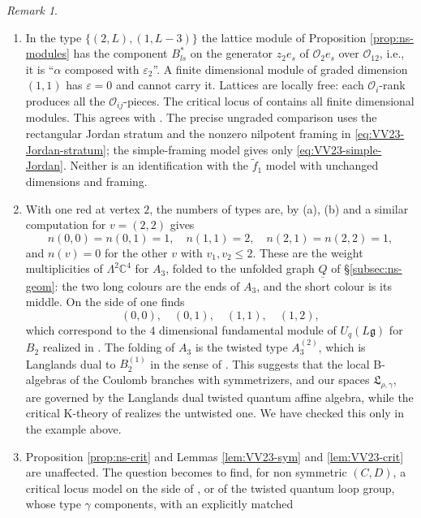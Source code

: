 \documentclass[11pt,reqno]{amsart}
\theoremstyle{definition}
\theoremstyle{remark}
\newtheorem{Remark}[Theorem]{Remark}
\def\bbC{\mathbb C}
\def\dQ{\underline Q}
\providecommand{\calO}{\mathcal O}
\begin{document}
\iffalse%
\begin{Remark}\label{rem:VV23}\hfill
\begin{enumerate}[label=$\mathrm{(\alph*)}$,leftmargin=8mm]
\item In the type $\{(2,L),(1,L-3)\}$ the
lattice module of Proposition \ref{prop:ns-modules} has the component $B^*_{ls}$ 
on the generator $z_2e_s$ of $\calO_2e_s$ over $\calO_{12}$, i.e., it is
``$\alpha$ composed with $\varepsilon_2$''. 
A finite dimensional module of graded dimension $(1,1)$ has $\varepsilon=0$ and cannot carry it. Lattices are
locally free: each $\calO_i$-rank produces all the $\calO_{ij}$-pieces. 
The critical locus of \cite{VV23} contains all finite dimensional modules.
This agrees with \cite[\S1]{HJV26}.
The precise ungraded comparison uses the rectangular Jordan
stratum and the nonzero nilpotent framing in
\eqref{eq:VV23-Jordan-stratum}; the simple-framing model gives only
\eqref{eq:VV23-simple-Jordan}. Neither is an identification with the
$\tilde f_1$ model with unchanged dimensions and framing.
\item With one red at vertex $2$, the numbers of types are, by (a), (b) and a similar computation for $v=(2,2)$ gives
\[
n(0,0)=n(0,1)=1,\quad n(1,1)=2,\quad n(2,1)=n(2,2)=1,
\]
and $n(v)=0$ for the other $v$ with $v_1,v_2\leqslant2$. These are the weight multiplicities of $\Lambda^2\bbC^4$ for $A_3$, folded to the unfolded graph
$\dQ$ of \S\ref{subsec:ns-geom}: the two long colours are the ends of $A_3$, and the short colour is its middle. 
On the side of \cite{VV23} one finds
$$(0,0),\quad
(0,1),\quad
(1,1),\quad
(1,2),$$
which correspond to the $4$ dimensional fundamental module of $U_q(L\mathfrak g)$ for $B_2$ realized in \cite[Thm.~1.3(a)]{VV23}. 
The folding of $A_3$ is the twisted type $A_3^{(2)}$, 
which is Langlands dual to $B_2^{(1)}$ in the sense of \cite{FH11}. This suggests that the local
B-algebras of the Coulomb branches with symmetrizers, and our spaces $\mathfrak L_{\rho,\gamma}$, 
are governed by the Langlands dual twisted
quantum affine algebra, while the critical K-theory of \cite{VV23} realizes the untwisted one. We have checked this only in the example above.
\item  Proposition \ref{prop:ns-crit} and Lemmas \ref{lem:VV23-sym} and \ref{lem:VV23-crit} are unaffected. The question becomes to
find, for non symmetric $(C,D)$, a critical locus model on the side of \cite{VV23}, or of the twisted quantum loop group, 
whose type $\gamma$ components, with an explicitly matched

\end{enumerate}
\end{Remark}
\end{document}
